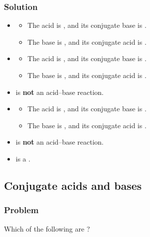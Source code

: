 \subsubsection{Solution}
\begin{itemize}
	\item {\color{accent} }
	      \begin{itemize}
		      \item The acid is , and its conjugate base is .
		      \item The base is , and its conjugate acid is .
	      \end{itemize}
	\item {\color{accent} }
	      \begin{itemize}
		      \item The acid is , and its conjugate base is .
		      \item The base is , and its conjugate acid is .
	      \end{itemize}
	\item {} is \textbf{not} an acid--base reaction.
	\item {\color{accent} }
	      \begin{itemize}
		      \item The acid is , and its conjugate base is .
		      \item The base is , and its conjugate acid is .
	      \end{itemize}
	\item {} is \textbf{not} an acid--base reaction.
	\item {\color{black!40!white} } is a .
\end{itemize}

\subsection{Conjugate acids and bases}

\subsubsection{Problem}
Which of the following are
?

